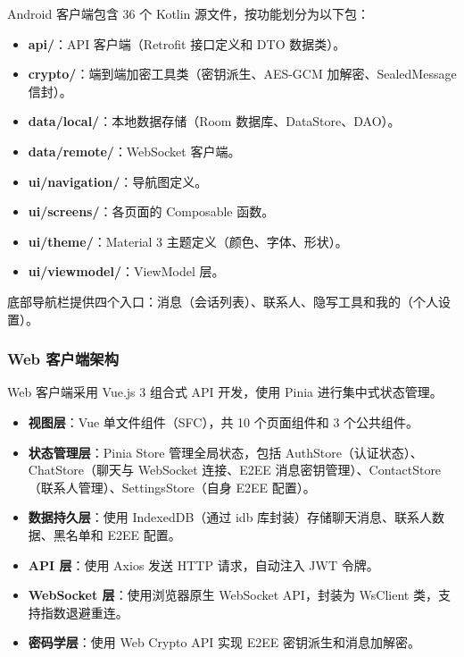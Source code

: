 Android 客户端包含 36 个 Kotlin 源文件，按功能划分为以下包：

\begin{itemize}
    \item \textbf{api/}：API 客户端（Retrofit 接口定义和 DTO 数据类）。
    \item \textbf{crypto/}：端到端加密工具类（密钥派生、AES-GCM 加解密、SealedMessage 信封）。
    \item \textbf{data/local/}：本地数据存储（Room 数据库、DataStore、DAO）。
    \item \textbf{data/remote/}：WebSocket 客户端。
    \item \textbf{ui/navigation/}：导航图定义。
    \item \textbf{ui/screens/}：各页面的 Composable 函数。
    \item \textbf{ui/theme/}：Material 3 主题定义（颜色、字体、形状）。
    \item \textbf{ui/viewmodel/}：ViewModel 层。
\end{itemize}

底部导航栏提供四个入口：消息（会话列表）、联系人、隐写工具和我的（个人设置）。

\subsubsection{Web 客户端架构}

Web 客户端采用 Vue.js 3 组合式 API 开发，使用 Pinia 进行集中式状态管理。

\begin{itemize}
    \item \textbf{视图层}：Vue 单文件组件（SFC），共 10 个页面组件和 3 个公共组件。
    \item \textbf{状态管理层}：Pinia Store 管理全局状态，包括 AuthStore（认证状态）、ChatStore（聊天与 WebSocket 连接、E2EE 消息密钥管理）、ContactStore（联系人管理）、SettingsStore（自身 E2EE 配置）。
    \item \textbf{数据持久层}：使用 IndexedDB（通过 idb 库封装）存储聊天消息、联系人数据、黑名单和 E2EE 配置。
    \item \textbf{API 层}：使用 Axios 发送 HTTP 请求，自动注入 JWT 令牌。
    \item \textbf{WebSocket 层}：使用浏览器原生 WebSocket API，封装为 WsClient 类，支持指数退避重连。
    \item \textbf{密码学层}：使用 Web Crypto API 实现 E2EE 密钥派生和消息加解密。
\end{itemize}

